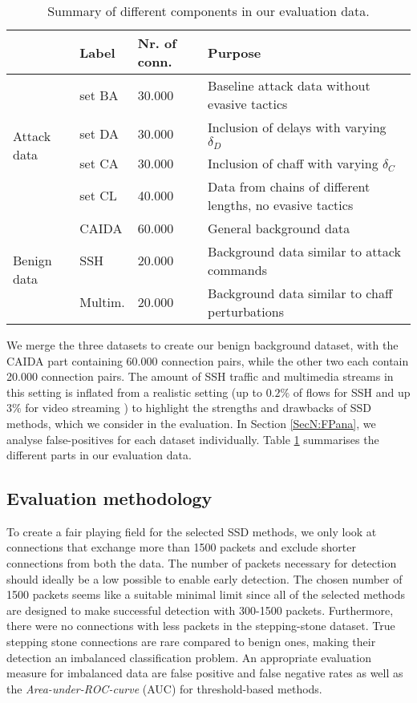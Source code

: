 \begin{table}
\centering
\begin{tabular}{p{2.3cm}|p{1.4cm}|p{2.3cm}|p{6.5cm}}
& Label  &Nr. of conn. & Purpose\\ \hline
\multirow{4}{*}{Attack data}& set BA & 30.000& Baseline attack data without evasive tactics \\ \cline{2-4}
						& set DA & 30.000& Inclusion of delays with varying $\delta_D$ \\ \cline{2-4}
						& set CA & 30.000& Inclusion of chaff with varying $\delta_C$ \\ \cline{2-4}
						& set CL & 40.000& Data from chains of different lengths,  no evasive tactics \\ \hline
\multirow{3}{*}{Benign data}&CAIDA & 60.000& General background data \\ \cline{2-4}
							&SSH & 20.000& Background data similar to attack commands \\ \cline{2-4}
							&Multim.& 20.000& Background data similar to chaff perturbations \\ \hline
\end{tabular}
\caption{Summary of different components in our evaluation data.}\label{figN:Datasim}
\vspace{-0.6cm}
\end{table}



We merge the three datasets to create our benign background dataset, with the CAIDA part containing 60.000 connection pairs, while the other two each contain 20.000 connection pairs. 
The amount of SSH traffic and multimedia streams in this setting is inflated from a realistic setting (up to $0.2\%$ of flows for SSH and up $3\%$ for video streaming \cite{velan2016network}) to highlight the strengths and drawbacks of SSD methods, which we consider in the evaluation.  
In Section \ref{SecN:FPana}, we analyse false-positives for each dataset individually.
Table \ref{figN:Datasim} summarises the different parts in our evaluation data.

\subsection{Evaluation methodology}

To create a fair playing field for the selected SSD methods, we only look at connections that exchange more than 1500 packets and exclude shorter connections from both the data.
The number of packets necessary for detection should ideally be a low possible to enable early detection. The chosen number of 1500 packets seems like a suitable minimal limit since all of the selected methods are designed to make successful detection with 300-1500 packets.  Furthermore, there were no connections with less packets in the stepping-stone dataset. 
True stepping stone connections are rare compared to benign ones, making their detection an imbalanced classification problem. An appropriate evaluation measure for imbalanced data are false positive and false negative rates as well as the \textit{Area-under-ROC-curve} (AUC) for threshold-based methods.


